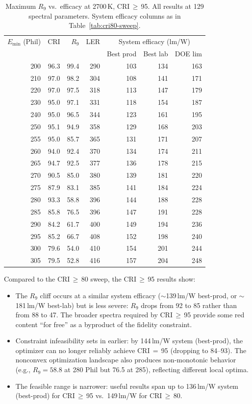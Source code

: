 \documentclass[11pt]{article}
\begin{document}
\begin{table}[H]
\centering
\caption{Maximum $R_9$ vs.\ efficacy at 2700\,K, CRI\,$\geq$\,95.
  All results at 129 spectral parameters.  System efficacy columns
  as in Table~\ref{tab:cri80-sweep}.}
\label{tab:cri95-sweep}
\begin{tabular}{rrrr|rrr}
\toprule
$E_{\min}$ (Phil) & CRI & $R_9$ & LER
  & \multicolumn{3}{c}{System efficacy (lm/W)} \\
  & & & & Best prod & Best lab & DOE lim \\
\midrule
200 & 96.3 & 99.4 & 290 & 103 & 134 & 163 \\
210 & 97.0 & 98.2 & 304 & 108 & 141 & 171 \\
220 & 97.0 & 97.5 & 318 & 113 & 147 & 179 \\
230 & 95.0 & 97.1 & 331 & 118 & 154 & 187 \\
240 & 95.0 & 96.5 & 344 & 123 & 161 & 195 \\
250 & 95.1 & 94.9 & 358 & 129 & 168 & 203 \\
255 & 95.0 & 85.7 & 365 & 131 & 171 & 207 \\
260 & 94.0 & 92.4 & 370 & 134 & 174 & 211 \\
265 & 94.7 & 92.5 & 377 & 136 & 178 & 215 \\
\midrule
270 & 90.5 & 85.0 & 380 & 139 & 181 & 220 \\
275 & 87.9 & 83.1 & 385 & 141 & 184 & 224 \\
280 & 93.3 & 58.8 & 396 & 144 & 188 & 228 \\
285 & 85.8 & 76.5 & 396 & 147 & 191 & 228 \\
290 & 84.2 & 61.7 & 400 & 149 & 194 & 236 \\
295 & 85.2 & 66.7 & 408 & 152 & 198 & 240 \\
300 & 79.6 & 54.0 & 410 & 154 & 201 & 244 \\
305 & 79.5 & 52.8 & 416 & 157 & 204 & 248 \\
\bottomrule
\end{tabular}
\end{table}

Compared to the CRI\,$\geq$\,80 sweep, the CRI\,$\geq$\,95 results show:
\begin{itemize}
\item The $R_9$ cliff occurs at a similar system efficacy
  ($\sim$139\,lm/W best-prod, or $\sim$181\,lm/W best-lab)
  but is less severe: $R_9$ drops from 92 to 85 rather than from 88 to 47.
  The broader spectra required by CRI\,$\geq$\,95 provide some red content
  ``for free'' as a byproduct of the fidelity constraint.
\item Constraint infeasibility sets in earlier: by 144\,lm/W system
  (best-prod), the optimizer can no longer reliably achieve CRI\,$=$\,95
  (dropping to 84--93).  The nonconvex optimization landscape also produces
  non-monotonic behavior (e.g., $R_9 = 58.8$ at 280 Phil but 76.5 at 285),
  reflecting different local optima.
\item The feasible range is narrower: useful results span up to
  136\,lm/W system (best-prod) for CRI\,$\geq$\,95 vs.\ 149\,lm/W for
  CRI\,$\geq$\,80.
\end{itemize}
\end{document}
